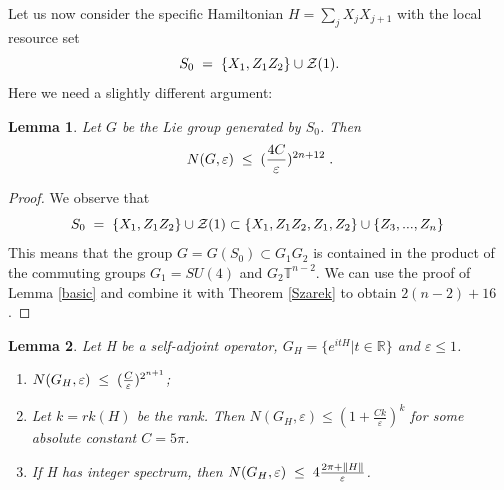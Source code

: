 \documentclass[12pt, a4-paper]{amsart}
\numberwithin{equation}{section}
\newcommand{\kl}{\pl \le \pl}
\newcommand{\lel}{\pl = \pl}
\newcommand{\rz}{{\mathbb R}}
\newcommand{\pl}{\hspace{.1cm}}
\newcommand{\eps}{\varepsilon}
\newtheorem{lemma}{Lemma}[section]
\begin{document}
Let us now consider the specific Hamiltonian $H=\sum_j X_{j}X_{j+1}$ with the local resource set
 \[ S_0\lel \{X_1,Z_1Z_2\}\cup \mathcal{Z}(1).\] 
Here we need a slightly different argument:  
\begin{lemma}\label{prod} Let $G$ be the Lie group generated by $S_0$. Then 
 \[ N(G,\eps) \kl (\frac{4C}{\eps})^{2n+12} \pl .\] 
\end{lemma} 
\begin{proof} We observe that  
 \[ S_0\lel \{X_1,Z_1Z_2\}\cup \mathcal{Z}(1) \subset
  \{X_1,Z_{1}Z_2,Z_1,Z_2\} \cup \{Z_3,...,Z_{n}\} \pl \] 
This means that the group $G=G(S_0)\subset G_1G_2$ is contained in the product of the commuting groups $G_1=SU(4)$ and $G_2\mathbb{T}^{n-2}$. We can use the proof of Lemma \ref{basic} and combine it with 
 Theorem \ref{Szarek} to obtain $2(n-2)+16$. 
\end{proof}

\begin{lemma}\label{lem:covering_exp(tH)} Let H be a self-adjoint operator, $G_H =\{e^{itH}|t \in \rz \}$ and $\eps\le 1$. 
\begin{enumerate}
\item[i)] $N(G_H,\eps)\kl (\frac{C}{\eps})^{2^{n+1}}$;
\item[ii)] Let $k=rk(H)$ be the rank. Then $N(G_H,\eps)\le (1+\frac{Ck}{\eps})^k$ for some absolute constant $C=5\pi$.
\item[iii)] If H has integer spectrum, then $N(G_H,\eps)\kl 4\frac{2\pi +\|H\|}{\eps}$.
\end{enumerate}
\end{lemma} 
\end{document}

